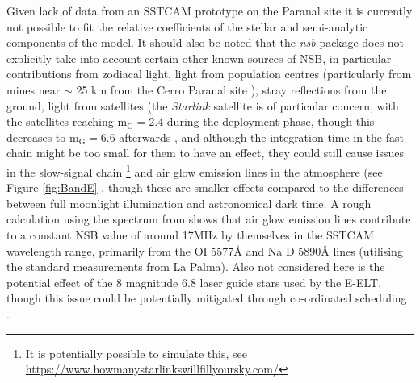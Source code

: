 Given lack of data from an SSTCAM prototype on the Paranal site it is currently not possible to fit the relative coefficients of the stellar and semi-analytic components of the model.  It should also be noted that the \textit{nsb} package does not explicitly take into account certain other known sources of NSB, in particular contributions from zodiacal light, light from population centres (particularly from mines near $\sim$ 25 km from the Cerro Paranal site \cite{cpmines}), stray reflections from the ground, light from satellites (the \textit{Starlink} satellite is of particular concern, with the satellites reaching $\mathrm{m_G=2.4}$ during the deployment phase, though this decreases to $\mathrm{m_G=6.6}$ afterwards \cite{starlink}, and although the integration time in the fast chain might be too small for them to have an effect, they could still cause issues in the slow-signal chain \cite{starlinkcta} \footnote{It is potentially possible to simulate this, see \url{https://www.howmanystarlinkswillfillyoursky.com/}} and air glow emission lines in the atmosphere (see Figure \ref{fig:BandE} \cite{BandE}, though these are smaller effects compared to the differences between full moonlight illumination and astronomical dark time. A rough calculation using the spectrum from \cite{BandE} shows that air glow emission lines contribute to a constant NSB value of around 17MHz by themselves in the SSTCAM wavelength range, primarily from the OI 5577\r{A} and Na D 5890\r{A} lines (utilising the standard \cite{BandE} measurements from La Palma). Also not considered here is the potential effect of the 8 magnitude 6.8 laser guide stars used by the E-ELT, though this issue could be potentially mitigated through co-ordinated scheduling \cite{gauglasers}. 
